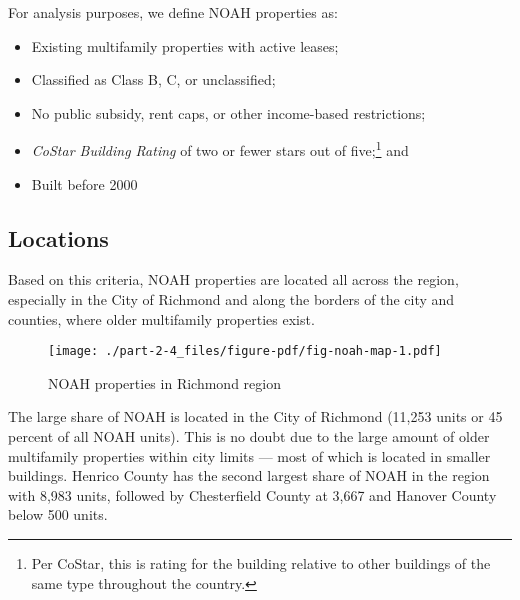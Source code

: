 \documentclass[
  letterpaper,
  DIV=11,
  numbers=noendperiod]{scrreprt}
\providecommand{\tightlist}{%
  \setlength{\itemsep}{0pt}\setlength{\parskip}{0pt}}\usepackage{longtable,booktabs,array}
\begin{document}
\begin{tcolorbox}[enhanced jigsaw, colframe=quarto-callout-note-color-frame, arc=.35mm, bottomrule=.15mm, colbacktitle=quarto-callout-note-color!10!white, opacityback=0, left=2mm, rightrule=.15mm, title=\textcolor{quarto-callout-note-color}{\faInfo}\hspace{0.5em}{Defining NOAH}, colback=white, coltitle=black, toptitle=1mm, leftrule=.75mm, titlerule=0mm, breakable, opacitybacktitle=0.6, toprule=.15mm, bottomtitle=1mm]

For analysis purposes, we define NOAH properties as:

\begin{itemize}
\tightlist
\item
  Existing multifamily properties with active leases;
\item
  Classified as Class B, C, or unclassified;
\item
  No public subsidy, rent caps, or other income-based restrictions;
\item
  \emph{CoStar Building Rating} of two or fewer stars out of
  five;\footnote{Per CoStar, this is rating for the building relative to
    other buildings of the same type throughout the country.} and
\item
  Built before 2000
\end{itemize}

\end{tcolorbox}

\hypertarget{locations-1}{%
\subsection{Locations}\label{locations-1}}

Based on this criteria, NOAH properties are located all across the
region, especially in the City of Richmond and along the borders of the
city and counties, where older multifamily properties exist.

\begin{figure}

{\centering \texttt{[image: ./part-2-4\_files/figure-pdf/fig-noah-map-1.pdf]}

}

\caption{\label{fig-noah-map}NOAH properties in Richmond region}

\end{figure}

The large share of NOAH is located in the City of Richmond (11,253 units
or 45 percent of all NOAH units). This is no doubt due to the large
amount of older multifamily properties within city limits --- most of
which is located in smaller buildings. Henrico County has the second
largest share of NOAH in the region with 8,983 units, followed by
Chesterfield County at 3,667 and Hanover County below 500 units.
\end{document}

